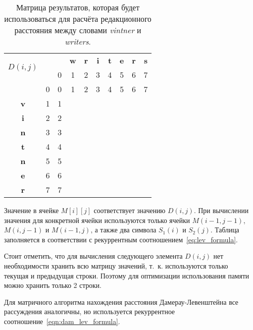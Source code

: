 \begin{table}[htb]
\caption{\centering Матрица результатов, которая будет использоваться для расчёта редакционного расстояния между словами \textit{vintner} и \textit{writers}.}
\small
\centering\begin{tabular}{|c|c|c|c|c|c|c|c|c|c|}
    \hline
    \multirow{2}{*}{$D(i,j)$} & \multirow{2}{*}{} & \multirow{1}{*}{} & \multirow{1}{*}{\textbf{w}} & \multirow{1}{*}{\textbf{r}} & \multirow{1}{*}{\textbf{i}} & \multirow{1}{*}{\textbf{t}} & \multirow{1}{*}{\textbf{e}} & \multirow{1}{*}{\textbf{r}} & \multirow{1}{*}{\textbf{s}} \\ \cline{3-10}
    & & 0 & 1 & 2 & 3 & 4 & 5 & 6 & 7 \\ \hline
    & 0 & 0 & 1 & 2 & 3 & 4 & 5 & 6 & 7 \\ \hline
    \textbf{v} & 1 & 1 & & & & & & & \\ \hline
    \textbf{i} & 2 & 2 & & & & & & & \\ \hline
    \textbf{n} & 3 & 3 & & & & & & & \\ \hline
    \textbf{t} & 4 & 4 & & & & & & & \\ \hline
    \textbf{n} & 5 & 5 & & & & & & & \\ \hline
    \textbf{e} & 6 & 6 & & & & & & & \\ \hline
    \textbf{r} & 7 & 7 & & & & & & & \\ \hline
\end{tabular}
\label{table:matrix}
\end{table}

Значение в ячейке \(M[i][j]\) соответствует значению \(D(i, j)\). При вычислении значения для конкретной ячейки используются только ячейки \(M(i - 1, j - 1)\), \(M(i, j - 1)\) и \(M(i - 1, j)\), а также два символа \(S_1(i)\) и \(S_2(j)\). Таблица заполняется в соответствии с рекуррентным соотношением~\ref{eq:lev_formula}.

Стоит отметить, что для вычисления следующего элемента \(D(i, j)\) нет необходимости хранить всю матрицу значений, т.~к. используются только текущая и предыдущая строки. Поэтому для оптимизации использования памяти можно хранить только 2 строки.

Для матричного алгоритма нахождения расстояния Дамерау-Левенштейна все рассуждения аналогичны, но используется рекуррентное соотношение~\ref{eqn:dam_lev_formula}.